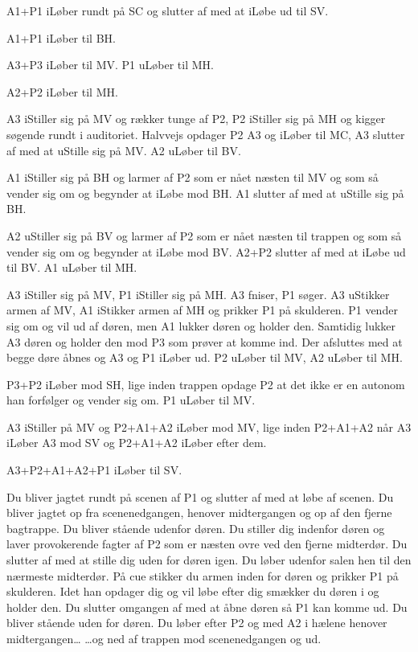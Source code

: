 \documentclass[a4paper,11pt]{article}
\begin{document}
\begin{sketch}
 A1+P1 iLøber rundt på SC og slutter af med at iLøbe ud til SV.


 A1+P1 iLøber til BH.


 A3+P3 iLøber til MV. P1 uLøber til MH.

 A2+P2 iLøber til MH.

 A3 iStiller sig på MV og rækker tunge af P2, P2 iStiller sig på MH
og kigger søgende rundt i auditoriet. Halvvejs opdager P2 A3 og iLøber
til MC, A3 slutter af med at uStille sig på MV. A2 uLøber til BV.

 A1 iStiller sig på BH og larmer af P2 som er nået næsten til MV og
som så vender sig om og begynder at iLøbe mod BH. A1 slutter af med at
uStille sig på BH.

 A2 uStiller sig på BV og larmer af P2 som er nået næsten til
trappen og som så vender sig om og begynder at iLøbe mod BV. A2+P2
slutter af med at iLøbe ud til BV. A1 uLøber til MH.

 A3 iStiller sig på MV, P1 iStiller sig på MH. A3 fniser, P1 søger.
A3 uStikker armen af MV, A1 iStikker armen af MH og prikker P1 på
skulderen. P1 vender sig om og vil ud af døren, men A1 lukker døren og
holder den. Samtidig lukker A3 døren og holder den mod P3 som prøver
at komme ind. Der afsluttes med at begge døre åbnes og A3 og P1 iLøber
ud. P2 uLøber til MV, A2 uLøber til MH.

 P3+P2 iLøber mod SH, lige inden trappen opdage P2 at det ikke er en
autonom han forfølger og vender sig om. P1 uLøber til MV.

 A3 iStiller på MV og P2+A1+A2 iLøber mod MV, lige inden P2+A1+A2
når A3 iLøber A3 mod SV og P2+A1+A2 iLøber efter dem.

 A3+P2+A1+A2+P1 iLøber til SV.


\newpage



 Du bliver jagtet rundt på scenen af P1 og slutter af med at løbe af scenen.
 Du bliver jagtet op fra scenenedgangen, henover midtergangen og op af den fjerne bagtrappe.
 Du bliver stående udenfor døren.
 Du stiller dig indenfor døren og laver provokerende fagter af P2 som er næsten ovre ved den fjerne midterdør. Du slutter af med at stille dig uden for døren igen.
 Du løber udenfor salen hen til den nærmeste midterdør.
 På cue stikker du armen inden for døren og prikker P1 på skulderen. Idet han opdager dig og vil løbe efter dig smækker du døren i og holder den. Du slutter omgangen af med at åbne døren så P1 kan komme ud.
 Du bliver stående uden for døren.
 Du løber efter P2 og med A2 i hælene henover midtergangen\dots{}
 \dots{}og ned af trappen mod scenenedgangen og ud.



\end{sketch}
\end{document}
